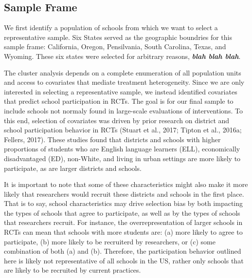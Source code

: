 \documentclass[man,floatsintext]{apa6}
\begin{document}
\hypertarget{sample-frame}{%
\subsection{Sample Frame}\label{sample-frame}}

We first identify a population of schools from which we want to select a representative sample. Six States served as the geographic boundries for this sample frame: California, Oregon, Pensilvania, South Carolina, Texas, and Wyoming. These six states were selected for arbitrary reasons, \textbf{\emph{blah blah blah}}.

The cluster analysis depends on a complete enumeration of all population units and access to covariates that mediate treatment heterogeneity. Since we are only interested in selecting a representative sample, we instead identified covariates that predict school participation in RCTs. The goal is for our final sample to include schools not normaly found in large-scale evaluations of interventions. To this end, selection of covariates was driven by prior research on district and school participation behavior in RCTs (Stuart et al., 2017; Tipton et al., 2016a; Fellers, 2017). These studies found that districts and schools with higher proportions of students who are English language learners (ELL), economically disadvantaged (ED), non-White, and living in urban settings are more likely to participate, as are larger districts and schools.

It is important to note that some of these characteristics might also make it more likely that researchers would recruit these districts and schools in the first place. That is to say, school characteristics may drive selection bias by both impacting the types of schools that agree to participate, as well as by the types of schools that researchers recruit. For instance, the overrepresentation of larger schools in RCTs can mean that schools with more students are: (a) more likely to agree to participate, (b) more likely to be recruiterd by researchers, or (c) some combination of both (a) and (b). Therefore, the participation behavior outlined here is likely not representative of all schools in the US, rather only schools that are likely to be recruited by current practices.
\end{document}
